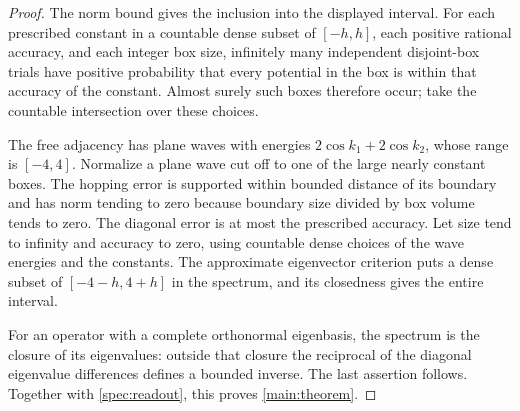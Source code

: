 \begin{proof}
The norm bound gives the inclusion into the displayed interval.
For each prescribed constant in a countable dense subset of $[-h,h]$,
each positive rational accuracy, and each integer box size, infinitely
many independent disjoint-box trials have positive probability that
every potential in the box is within that accuracy of the constant.
Almost surely such boxes therefore occur; take the countable
intersection over these choices.

The free adjacency has plane waves with energies
$2\cos k_1+2\cos k_2$, whose range is $[-4,4]$. Normalize a plane
wave cut off to one of the large nearly constant boxes. The hopping
error is supported within bounded distance of its boundary and has
norm tending to zero because boundary size divided by box volume
tends to zero. The diagonal error is at most the prescribed accuracy.
Let size tend to infinity and accuracy to zero, using countable dense
choices of the wave energies and the constants. The approximate
eigenvector criterion puts a dense subset of $[-4-h,4+h]$ in the
spectrum, and its closedness gives the entire interval.

For an operator with a complete orthonormal eigenbasis, the spectrum
is the closure of its eigenvalues: outside that closure the reciprocal
of the diagonal eigenvalue differences defines a bounded inverse.
The last assertion follows. Together with \cref{spec:readout}, this
proves \cref{main:theorem}.
\end{proof}
